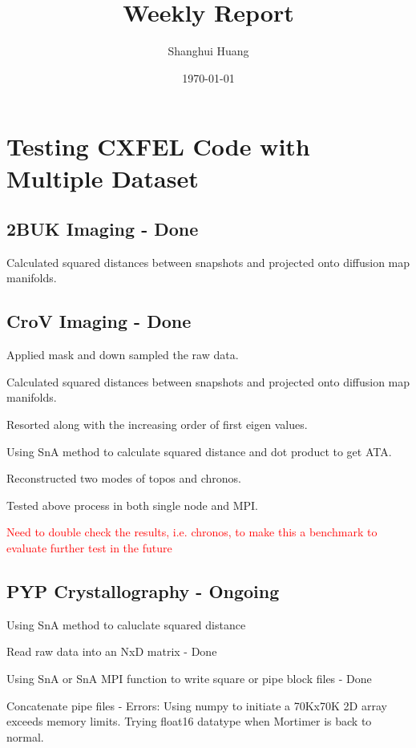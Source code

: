 \documentclass{article}
\title{Weekly Report} %
\author{Shanghui Huang} %
\date{\today} %
\begin{document}
\maketitle

\section*{Testing CXFEL Code with Multiple Dataset}
\subsection*{2BUK Imaging - Done}
Calculated squared distances between snapshots and projected onto diffusion map manifolds.

\subsection*{CroV Imaging - Done}
\noindent Applied mask and down sampled the raw data.

\noindent Calculated squared distances between snapshots and projected onto diffusion map manifolds.

\noindent Resorted along with the increasing order of first eigen values.

\noindent Using SnA method to calculate squared distance and dot product to get ATA.

\noindent Reconstructed two modes of topos and chronos.

\noindent Tested above process in both single node and MPI.

\noindent \textcolor{red}{Need to double check the results, i.e. chronos, to make this a benchmark to evaluate further test in the future}

\subsection*{PYP Crystallography - Ongoing}
Using SnA method to caluclate squared distance

Read raw data into an NxD matrix - Done

Using SnA or SnA MPI function to write square or pipe block files - Done

\begin{adjustwidth}{\parindent}{}
Concatenate pipe files - Errors: Using numpy to initiate a 70Kx70K 2D array exceeds memory limits. Trying float16 datatype when Mortimer is back to normal.
\end{adjustwidth}
\end{document}
